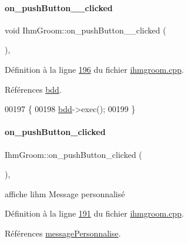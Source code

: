\paragraph{\texorpdfstring{on\+\_\+push\+Button\+\_\+\_\+clicked}{on\_pushButton\_9\_clicked}}
{\footnotesize\ttfamily void Ihm\+Groom\+::on\+\_\+push\+Button\+\_\+\_\+clicked (\begin{DoxyParamCaption}{ }\end{DoxyParamCaption})\hspace{0.3cm}{\ttfamily [private]}, {\ttfamily [slot]}}



Définition à la ligne \hyperlink{ihmgroom_8cpp_source_l00196}{196} du fichier \hyperlink{ihmgroom_8cpp_source}{ihmgroom.\+cpp}.



Références \hyperlink{ihmgroom_8h_source_l00090}{bdd}.


\begin{DoxyCode}
00197 \{
00198     \hyperlink{class_ihm_groom_aba1bfff9bc610e6a626d3af4cec266f9}{bdd}->exec();
00199 \}
\end{DoxyCode}
\mbox{\label{class_ihm_groom_ad3fbc13397279793b240d54b5a5f20b4}} 
\paragraph{\texorpdfstring{on\+\_\+push\+Button\+\_\+clicked}{on\_pushButton\_clicked}}
{\footnotesize\ttfamily Ihm\+Groom\+::on\+\_\+push\+Button\+\_\+clicked (\begin{DoxyParamCaption}{ }\end{DoxyParamCaption})\hspace{0.3cm}{\ttfamily [private]}, {\ttfamily [slot]}}



affiche l\textquotesingle{}ihm Message personnalisé 



Définition à la ligne \hyperlink{ihmgroom_8cpp_source_l00191}{191} du fichier \hyperlink{ihmgroom_8cpp_source}{ihmgroom.\+cpp}.



Références \hyperlink{ihmgroom_8h_source_l00088}{message\+Personnalise}.


